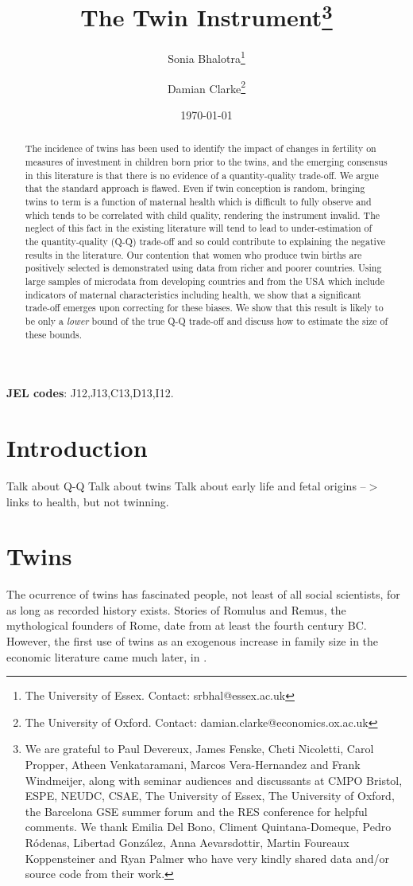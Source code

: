 \documentclass[subeqn]{article}
\title{The Twin Instrument\footnote{We are grateful to Paul Devereux, James 
Fenske, Cheti Nicoletti, Carol Propper, Atheen Venkataramani, Marcos 
Vera-Hernandez and Frank Windmeijer, along with seminar audiences and discussants 
at CMPO Bristol, ESPE, NEUDC, CSAE, The University of Essex, The University of 
Oxford, the Barcelona GSE summer forum and the RES conference for helpful 
comments.  We thank Emilia Del Bono, Climent Quintana-Domeque, Pedro R\'odenas, 
Libertad Gonz\'alez, Anna Aevarsdottir, Martin Foureaux Koppensteiner and Ryan 
Palmer who have very kindly shared data and/or source code from their work.}}
\author{Sonia Bhalotra\thanks{The University of Essex.
Contact: srbhal@essex.ac.uk} 
\and Damian Clarke\thanks{The University of Oxford. 
Contact: damian.clarke@economics.ox.ac.uk}}
\date{\today}
\begin{document}
\begin{spacing}{1.4}

\maketitle
\begin{abstract}
 The incidence of twins has been used to identify the impact of changes in 
 fertility on measures of investment in children born prior to the twins, and
 the emerging consensus in this literature is that there is no evidence of a
 quantity-quality trade-off. We argue that the standard approach is flawed.
 Even if twin conception is random, bringing twins to term is a function of
 maternal health which is difficult to fully observe and which tends to be
 correlated with child quality, rendering the instrument invalid. The neglect
 of this fact in the existing literature will tend to lead to under-estimation of 
 the quantity-quality (Q-Q) trade-off and so could contribute to explaining the 
 negative results in the literature. Our contention that women who produce twin 
 births are positively selected is demonstrated using data from richer and poorer
 countries. Using large samples of microdata from developing countries and from 
 the USA which include indicators of maternal characteristics including health, 
 we show that a significant trade-off emerges upon correcting for these biases. 
 We show that this result is likely to be only a \emph{lower} bound of the true
 Q-Q trade-off and discuss how to estimate the size of these bounds.
 \\
\end{abstract}
\hspace{4mm}\textbf{\small JEL codes}: J12,J13,C13,D13,I12. \\

\newpage
\section{Introduction}                             \label{TWINscn:intro}

Talk about Q-Q
Talk about twins
Talk about early life and fetal origins --$>$ links to health, but not twinning.

\section{Twins}                                    \label{TWINscn:literature}
The ocurrence of twins has fascinated people, not least of all social 
scientists, for as long as recorded history exists. Stories of Romulus and 
Remus, the mythological founders of Rome, date from at least the fourth century 
BC. However, the first use of twins as an exogenous increase in family size in 
the economic literature came much later, in \citet{RosenzweigWolpin1980}.


\end{spacing}
\end{document}
